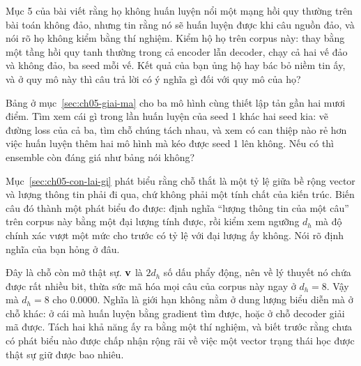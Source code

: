\tierextend

\begin{bt}
  \item Mục 5 của bài viết rằng họ không huấn luyện nổi một mạng hồi quy thường
    trên bài toán không đảo, nhưng tin rằng nó sẽ huấn luyện được khi câu nguồn
    đảo, và nói rõ họ không kiểm bằng thí nghiệm. Kiểm hộ họ trên corpus này:
    thay  bằng một tầng hồi quy tanh thường trong cả encoder
    lẫn decoder, chạy cả hai vế đảo và không đảo, ba seed mỗi vế. Kết quả của
    bạn ủng hộ hay bác bỏ niềm tin ấy, và ở quy mô này thì câu trả lời có ý
    nghĩa gì đối với quy mô của họ?

  \item Bảng ở mục~\ref{sec:ch05-giai-ma} cho ba mô hình cùng thiết lập tản gần
    hai mươi điểm. Tìm xem cái gì trong lần huấn luyện của seed 1 khác hai seed
    kia: vẽ đường loss của cả ba, tìm chỗ chúng tách nhau, và xem có can thiệp
    nào rẻ hơn việc huấn luyện thêm hai mô hình mà kéo được seed 1 lên không.
    Nếu có thì ensemble còn đáng giá như bảng nói không?

  \item Mục~\ref{sec:ch05-con-lai-gi} phát biểu rằng chỗ thắt là một tỷ lệ giữa
    bề rộng vector và lượng thông tin phải đi qua, chứ không phải một tính chất
    của kiến trúc. Biến câu đó thành một phát biểu đo được: định nghĩa
    \enquote{lượng thông tin của một câu} trên corpus này bằng một đại lượng
    tính được, rồi kiểm xem ngưỡng \(d_h\) mà độ chính xác vượt một mức cho
    trước có tỷ lệ với đại lượng ấy không. Nói rõ định nghĩa của bạn hỏng ở đâu.

  \item Đây là chỗ còn mở thật sự. \(\mathbf{v}\) là \(2 d_h\) số dấu phẩy động,
    nên về lý thuyết nó chứa được rất nhiều bit, thừa sức mã hóa mọi câu của
    corpus này ngay ở \(d_h = 8\). Vậy mà \(d_h = 8\) cho 0.0000. Nghĩa là giới
    hạn không nằm ở dung lượng biểu diễn mà ở chỗ khác: ở cái mà huấn luyện
    bằng gradient tìm được, hoặc ở chỗ decoder giải mã được. Tách hai khả năng
    ấy ra bằng một thí nghiệm, và biết trước rằng chưa có phát biểu nào được
    chấp nhận rộng rãi về việc một vector trạng thái học được thật sự giữ được
    bao nhiêu.
\end{bt}
